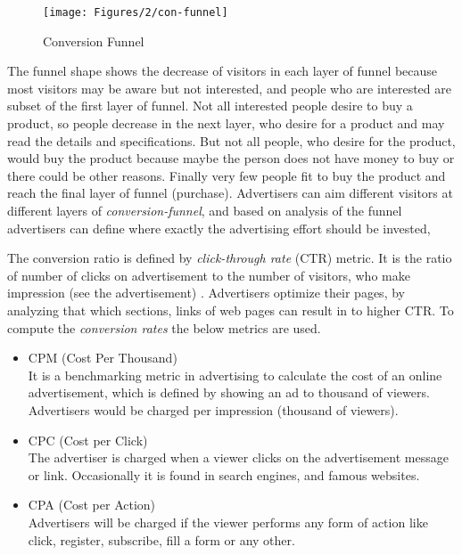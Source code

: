 \begin{figure}[H]
\centering
\texttt{[image: Figures/2/con-funnel]}
\caption{Conversion Funnel}
\label{fig:conversion_funnel}
\end{figure}

The funnel shape shows the decrease of visitors in each layer of funnel because most visitors may be aware but not interested, and people who are interested are subset of the first layer of funnel. Not all interested people desire to buy a product, so people decrease in the next layer, who desire for a product and may read the details and specifications. But not all people, who desire for the product, would buy the product because maybe the person does not have money to buy or there could be other reasons. Finally very few people fit to buy the product and reach the final layer of funnel (purchase). 
Advertisers can aim different visitors at different layers of \emph{conversion-funnel}, and based on analysis of the funnel advertisers can define where exactly the advertising effort should be invested, \cite{ad_effor_funnel}

The conversion ratio is defined by \emph{click-through rate} (CTR) metric. It is the ratio of  number of clicks on advertisement to the number of visitors, who make impression (see the advertisement) \cite{convfunnel}. Advertisers optimize their pages, by analyzing that which sections, links of web pages can result in to higher CTR. To compute the \emph{conversion rates} the below metrics are used.


\begin{itemize}
\item CPM (Cost Per Thousand) \\
It is a benchmarking metric in advertising to calculate the cost of an online advertisement, which is defined by showing an ad to thousand of viewers. Advertisers would be charged per impression (thousand of viewers). 

\item CPC (Cost per Click) \\
The advertiser is charged when a viewer clicks on the advertisement message or link. Occasionally it is found in search engines, and famous websites. 

\item CPA (Cost per Action)\\
Advertisers will be charged if the viewer performs any form of action like click, register, subscribe, fill a form or any other.

\end{itemize}



